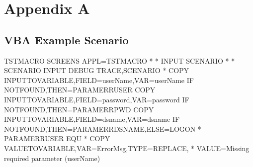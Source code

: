\documentclass[letterpaper,10pt,english]{sphinxmanual}
\begin{document}


\chapter{Appendix A}
\label{\detokenize{TN201904:appendix-a}}

\section{VBA Example Scenario}
\label{\detokenize{TN201904:vba-example-scenario}}
\begin{sphinxVerbatim}[commandchars=\\\{\}]
TSTMACRO SCREENS APPL=TSTMACRO
*\PYGZsh{}\PYGZsh{}\PYGZsh{}\PYGZsh{}\PYGZsh{}\PYGZsh{}\PYGZsh{}\PYGZsh{}\PYGZsh{}\PYGZsh{}\PYGZsh{}\PYGZsh{}\PYGZsh{}\PYGZsh{}\PYGZsh{}\PYGZsh{}\PYGZsh{}\PYGZsh{}\PYGZsh{}\PYGZsh{}\PYGZsh{}\PYGZsh{}\PYGZsh{}\PYGZsh{}\PYGZsh{}\PYGZsh{}\PYGZsh{}\PYGZsh{}\PYGZsh{}\PYGZsh{}\PYGZsh{}\PYGZsh{}\PYGZsh{}\PYGZsh{}\PYGZsh{}\PYGZsh{}\PYGZsh{}\PYGZsh{}\PYGZsh{}\PYGZsh{}\PYGZsh{}\PYGZsh{}\PYGZsh{}\PYGZsh{}\PYGZsh{}\PYGZsh{}\PYGZsh{}\PYGZsh{}\PYGZsh{}\PYGZsh{}\PYGZsh{}\PYGZsh{}\PYGZsh{}\PYGZsh{}\PYGZsh{}\PYGZsh{}\PYGZsh{}\PYGZsh{}\PYGZsh{}\PYGZsh{}\PYGZsh{}\PYGZsh{}\PYGZsh{}\PYGZsh{}\PYGZsh{}\PYGZsh{}\PYGZsh{}\PYGZsh{}\PYGZsh{}\PYGZsh{}
*\PYGZsh{}\PYGZsh{}                         INPUT SCENARIO                           \PYGZsh{}\PYGZsh{}
*\PYGZsh{}\PYGZsh{}\PYGZsh{}\PYGZsh{}\PYGZsh{}\PYGZsh{}\PYGZsh{}\PYGZsh{}\PYGZsh{}\PYGZsh{}\PYGZsh{}\PYGZsh{}\PYGZsh{}\PYGZsh{}\PYGZsh{}\PYGZsh{}\PYGZsh{}\PYGZsh{}\PYGZsh{}\PYGZsh{}\PYGZsh{}\PYGZsh{}\PYGZsh{}\PYGZsh{}\PYGZsh{}\PYGZsh{}\PYGZsh{}\PYGZsh{}\PYGZsh{}\PYGZsh{}\PYGZsh{}\PYGZsh{}\PYGZsh{}\PYGZsh{}\PYGZsh{}\PYGZsh{}\PYGZsh{}\PYGZsh{}\PYGZsh{}\PYGZsh{}\PYGZsh{}\PYGZsh{}\PYGZsh{}\PYGZsh{}\PYGZsh{}\PYGZsh{}\PYGZsh{}\PYGZsh{}\PYGZsh{}\PYGZsh{}\PYGZsh{}\PYGZsh{}\PYGZsh{}\PYGZsh{}\PYGZsh{}\PYGZsh{}\PYGZsh{}\PYGZsh{}\PYGZsh{}\PYGZsh{}\PYGZsh{}\PYGZsh{}\PYGZsh{}\PYGZsh{}\PYGZsh{}\PYGZsh{}\PYGZsh{}\PYGZsh{}\PYGZsh{}\PYGZsh{}
*
   SCENARIO INPUT
   DEBUG\PYGZdl{} TRACE,SCENARIO
*
   COPY\PYGZdl{} INPUT\PYGZhy{}TO\PYGZhy{}VARIABLE,FIELD=\PYGZsq{}userName\PYGZsq{},VAR=\PYGZsq{}userName\PYGZsq{}
   IF\PYGZdl{}   NOT\PYGZhy{}FOUND,THEN=PARAM\PYGZus{}ERR\PYGZus{}USER
   COPY\PYGZdl{} INPUT\PYGZhy{}TO\PYGZhy{}VARIABLE,FIELD=\PYGZsq{}password\PYGZsq{},VAR=\PYGZsq{}password\PYGZsq{}
   IF\PYGZdl{}   NOT\PYGZhy{}FOUND,THEN=PARAM\PYGZus{}ERR\PYGZus{}PWD
   COPY\PYGZdl{} INPUT\PYGZhy{}TO\PYGZhy{}VARIABLE,FIELD=\PYGZsq{}dsname\PYGZsq{},VAR=\PYGZsq{}dsname\PYGZsq{}
   IF\PYGZdl{}   NOT\PYGZhy{}FOUND,THEN=PARAM\PYGZus{}ERR\PYGZus{}DSNAME,ELSE=LOGON
*
PARAM\PYGZus{}ERR\PYGZus{}USER EQU *
   COPY\PYGZdl{} VALUE\PYGZhy{}TO\PYGZhy{}VARIABLE,VAR=ErrorMsg,TYPE=REPLACE,            *
         VALUE=\PYGZsq{}Missing required parameter (userName)\PYGZsq{}


\end{sphinxVerbatim}
\end{document}
